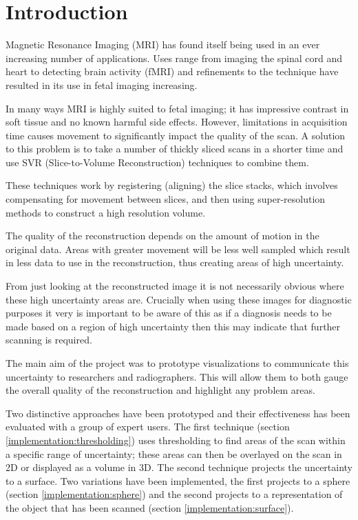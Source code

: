 \chapter{Introduction}\label{chapter:introduction}

Magnetic Resonance Imaging (MRI) has found itself being used in an ever increasing number of applications. Uses range from imaging the spinal cord and heart to detecting brain activity (fMRI) and refinements to the technique have resulted in its use in fetal imaging increasing.

In many ways MRI is highly suited to fetal imaging; it has impressive contrast in soft tissue and no known harmful side effects. However, limitations in acquisition time causes movement to significantly impact the quality of the scan. A solution to this problem is to take a number of thickly sliced scans in a shorter time and use SVR (Slice-to-Volume Reconstruction) techniques to combine them.

These techniques work by registering (aligning) the slice stacks, which involves compensating for movement between slices, and then using super-resolution methods to construct a high resolution volume.

The quality of the reconstruction depends on the amount of motion in the original data. Areas with greater movement will be less well sampled which result in less data to use in the reconstruction, thus creating areas of high uncertainty.

From just looking at the reconstructed image it is not necessarily obvious where these high uncertainty areas are. Crucially when using these images for diagnostic purposes it very is important to be aware of this as if a diagnosis needs to be made based on a region of high uncertainty then this may indicate that further scanning is required.

The main aim of the project was to prototype visualizations to communicate this uncertainty to researchers and radiographers. This will allow them to both gauge the overall quality of the reconstruction and highlight any problem areas.

Two distinctive approaches have been prototyped and their effectiveness has been evaluated with a group of expert users. The first technique (section \ref{implementation:thresholding}) uses thresholding to find areas of the scan within a specific range of uncertainty; these areas can then be overlayed on the scan in 2D or displayed as a volume in 3D. The second technique projects the uncertainty to a surface. Two variations have been implemented, the first projects to a sphere (section \ref{implementation:sphere}) and the second projects to a representation of the object that has been scanned (section \ref{implementation:surface}).

